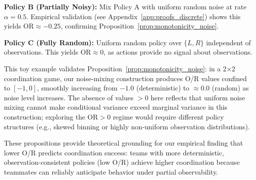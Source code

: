 \textbf{Policy B (Partially Noisy):} Mix Policy A with uniform random noise at rate $\alpha = 0.5$. Empirical validation (see Appendix~\ref{app:proofs_discrete}) shows this yields $\mathrm{OR} \approx -0.25$, confirming Proposition~\ref{prop:monotonicity_noise}.

\textbf{Policy C (Fully Random):} Uniform random policy over $\{L, R\}$ independent of observations. This yields $\mathrm{OR} \approx 0$, as actions provide no signal about observations.

This toy example validates Proposition~\ref{prop:monotonicity_noise}: in a 2×2 coordination game, our noise-mixing construction produces O/R values confined to $[-1, 0]$, smoothly increasing from $-1.0$ (deterministic) to $\approx 0.0$ (random) as noise level increases. The absence of values $> 0$ here reflects that uniform noise mixing cannot make conditional variance exceed marginal variance in this construction; exploring the $\mathrm{OR} > 0$ regime would require different policy structures (e.g., skewed binning or highly non-uniform observation distributions).

These propositions provide theoretical grounding for our empirical finding that lower O/R predicts coordination success: teams with more deterministic, observation-consistent policies (low O/R) achieve higher coordination because teammates can reliably anticipate behavior under partial observability.

